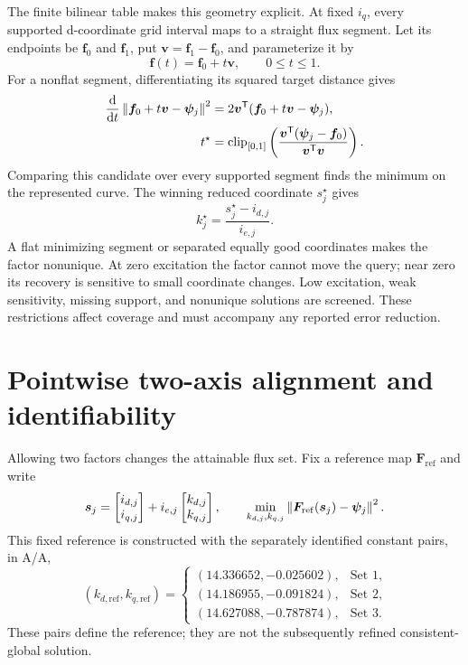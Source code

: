 The finite bilinear table makes this geometry explicit. At fixed $i_q$, every supported d-coordinate grid interval maps to a straight flux segment. Let its endpoints be $\bm f_0$ and $\bm f_1$, put $\bm v=\bm f_1-\bm f_0$, and parameterize it by
\begin{equation}
\bm f(t)=\bm f_0+t\bm v,\qquad 0\le t\le1.
\end{equation}
For a nonflat segment, differentiating its squared target distance gives
\begin{align}
\frac{\mathrm d}{\mathrm d t}\left\lVert\bm f_0+t\bm v-\bm\psi_j\right\rVert^2
&=2\bm v^\mathsf T(\bm f_0+t\bm v-\bm\psi_j),\\
t^\star&=\operatorname{clip}_{[0,1]}
\left(\frac{\bm v^\mathsf T(\bm\psi_j-\bm f_0)}{\bm v^\mathsf T\bm v}\right).
\end{align}
Comparing this candidate over every supported segment finds the minimum on the represented curve. The winning reduced coordinate $s_j^\star$ gives
\begin{equation}
k_j^\star=\frac{s_j^\star-i_{d,j}}{i_{e,j}}.
\end{equation}
A flat minimizing segment or separated equally good coordinates makes the factor nonunique. At zero excitation the factor cannot move the query; near zero its recovery is sensitive to small coordinate changes. Low excitation, weak sensitivity, missing support, and nonunique solutions are screened. These restrictions affect coverage and must accompany any reported error reduction.

\section{Pointwise two-axis alignment and identifiability}

Allowing two factors changes the attainable flux set. Fix a reference map $\bm F_{\mathrm{ref}}$ and write
\begin{equation}
\bm s_j=\begin{bmatrix}i_{d,j}\\i_{q,j}\end{bmatrix}
+i_{e,j}\begin{bmatrix}k_{d,j}\\k_{q,j}\end{bmatrix},
\qquad
\min_{k_{d,j},k_{q,j}}\left\lVert\bm F_{\mathrm{ref}}(\bm s_j)-\bm\psi_j\right\rVert^2.
\end{equation}
This fixed reference is constructed with the separately identified constant pairs, in A/A,
\begin{equation}
(k_{d,\mathrm{ref}},k_{q,\mathrm{ref}})
=\begin{cases}
(14.336652,-0.025602),&\text{Set 1},\\
(14.186955,-0.091824),&\text{Set 2},\\
(14.627088,-0.787874),&\text{Set 3}.
\end{cases}
\end{equation}
These pairs define the reference; they are not the subsequently refined consistent-global solution.

